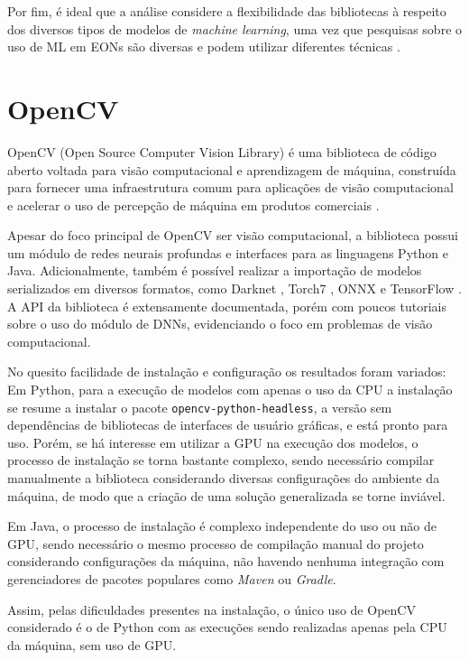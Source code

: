 Por fim, é ideal que a análise considere a flexibilidade das bibliotecas à respeito dos diversos tipos de modelos de \textit{machine learning}, uma vez que pesquisas sobre o uso de ML em EONs são diversas e podem utilizar diferentes técnicas \cite{eon_ml_survey_2020}.

\section{OpenCV}

OpenCV (Open Source Computer Vision Library) é uma biblioteca de código aberto voltada para visão computacional e aprendizagem de máquina, construída para fornecer uma infraestrutura comum para aplicações de visão computacional e acelerar o uso de percepção de máquina em produtos comerciais \cite{ml_site_opencv}.

Apesar do foco principal de OpenCV ser visão computacional, a biblioteca possui um módulo de redes neurais profundas e interfaces para as linguagens Python e Java. Adicionalmente, também é possível realizar a importação de modelos serializados em diversos formatos, como Darknet \cite{ml_site_darknet}, Torch7 \cite{ml_site_torch}, ONNX \cite{ml_site_onnx} e TensorFlow \cite{ml_site_tensorflow}. A \acrshort{API} da biblioteca é extensamente documentada, porém com poucos tutoriais sobre o uso do módulo de DNNs, evidenciando o foco em problemas de visão computacional.

No quesito facilidade de instalação e configuração os resultados foram variados: Em Python, para a execução de modelos com apenas o uso da CPU a instalação se resume a instalar o pacote \texttt{opencv-python-headless}, a versão sem dependências de bibliotecas de interfaces de usuário gráficas, e está pronto para uso. Porém, se há interesse em utilizar a GPU na execução dos modelos, o processo de instalação se torna bastante complexo, sendo necessário compilar manualmente a biblioteca considerando diversas configurações do ambiente da máquina, de modo que a criação de uma solução generalizada se torne inviável.

Em Java, o processo de instalação é complexo independente do uso ou não de GPU, sendo necessário o mesmo processo de compilação manual do projeto considerando configurações da máquina, não havendo nenhuma integração com gerenciadores de pacotes populares como \textit{Maven} ou \textit{Gradle}.

Assim, pelas dificuldades presentes na instalação, o único uso de OpenCV considerado é o de Python com as execuções sendo realizadas apenas pela CPU da máquina, sem uso de GPU.

